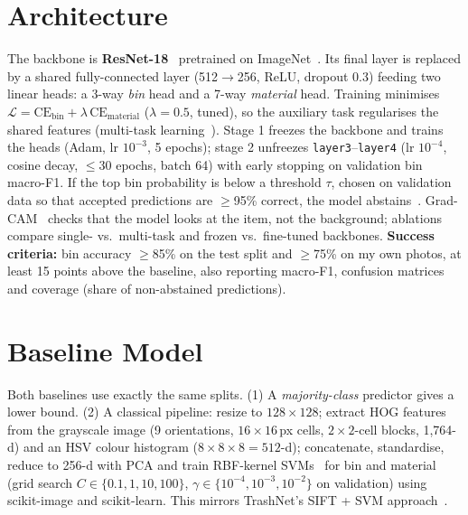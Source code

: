 \documentclass[final]{article}
\begin{document}
\section*{Architecture}
The backbone is \textbf{ResNet-18}~\cite{he2016} pretrained on ImageNet~\cite{deng2009}. Its final layer is replaced by a shared fully-connected layer (512$\to$256, ReLU, dropout 0.3) feeding two linear heads: a 3-way \emph{bin} head and a 7-way \emph{material} head. Training minimises $\mathcal{L}=\mathrm{CE}_{\text{bin}}+\lambda\,\mathrm{CE}_{\text{material}}$ ($\lambda=0.5$, tuned), so the auxiliary task regularises the shared features (multi-task learning~\cite{caruana1997}). Stage 1 freezes the backbone and trains the heads (Adam, lr $10^{-3}$, 5 epochs); stage 2 unfreezes \texttt{layer3}--\texttt{layer4} (lr $10^{-4}$, cosine decay, $\le$30 epochs, batch 64) with early stopping on validation bin macro-F1. If the top bin probability is below a threshold $\tau$, chosen on validation data so that accepted predictions are $\ge$95\% correct, the model abstains~\cite{geifman2017}. Grad-CAM~\cite{selvaraju2017} checks that the model looks at the item, not the background; ablations compare single- vs.\ multi-task and frozen vs.\ fine-tuned backbones.
\textbf{Success criteria:} bin accuracy $\ge$85\% on the test split and $\ge$75\% on my own photos, at least 15 points above the baseline, also reporting macro-F1, confusion matrices and coverage (share of non-abstained predictions).

\section*{Baseline Model}
Both baselines use exactly the same splits. (1) A \emph{majority-class} predictor gives a lower bound. (2) A classical pipeline: resize to $128\times128$; extract HOG features~\cite{dalal2005} from the grayscale image (9 orientations, $16\times16$\,px cells, $2\times2$-cell blocks, 1,764-d) and an HSV colour histogram ($8\times8\times8=512$-d); concatenate, standardise, reduce to 256-d with PCA and train RBF-kernel SVMs~\cite{cortes1995} for bin and material (grid search $C\in\{0.1,1,10,100\}$, $\gamma\in\{10^{-4},10^{-3},10^{-2}\}$ on validation) using scikit-image and scikit-learn. This mirrors TrashNet's SIFT + SVM approach~\cite{thung2016}.
\end{document}
